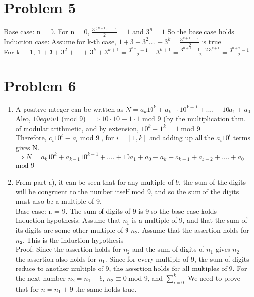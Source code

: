 \documentclass[english]{article}
\begin{document}
\section*{Problem 5}
Base case: n = 0. For n = 0, $ \frac{3^(n+1) - 1}{2} = 1$ and $3^n = 1$ So the base case holds\\
Induction case: Assume for k-th case, $1 + 3 + 3^2 ....+ 3^k = \frac{3^{k+1} - 1}{2} $ is true\\
For k + 1, $ 1 + 3 + 3^2 + ...+3^k + 3^{k+1} = \frac{3^{k+1} - 1}{2} + 3^{k+1} = \frac{3^{n+1} - 1 + 2.3^{k+1}}{2} = \frac{3^{n+2} - 1}{2}$
\section*{Problem 6}
\begin{enumerate} [label=\alph*]
\item A positive integer can be written as $N = a_k 10^k + a_{k-1} 10 ^ {k-1} + .... + 10 a_1 + a_0$ Also, $10 equiv 1 $ (mod 9) $\implies 10 \cdot 10 \equiv 1 \cdot 1 $ mod 9 (by the multiplication thm. of modular arithmetic, and by extension, $10^k \equiv 1^k = 1 $ mod 9\\
Therefore, $a_i 10^i \equiv a_i $ mod 9 , for $i = [1,k]$ and adding up all the $a_i 10^i$ terms gives N. $\Rightarrow N = a_k 10^k + a_{k-1} 10 ^ {k-1} + .... + 10 a_1 + a_0  \equiv a_k + a_{k-1} + a_{k-2} + .... + a_0 $ mod 9
\item From part a), it can be seen that for any multiple of 9, the sum of the digits will be congruent to the number itself mod 9, and so the sum of the digits must also be a multiple of 9.\\
Base case: n = 9. The sum of digits of 9 is 9 so the base case holds\\
Induction hypothesis: Assume that $n_1$ is a multiple of 9, and that the sum of its digits are some other multiple of 9 $n_2$. Assume that the assertion holds for $n_2$. This is the induction hypothesis \\
Proof: Since the assertion holds for $n_2$ and the sum of digits of $n_1$ gives $n_2$ the assertion also holds for $n_1$. Since for every multiple of 9, the sum of digits reduce to another multiple of 9, the assertion holds for all multiples of 9. 
For the next number $n_2 = n_1 + 9$, $n_2 \equiv 0$ mod 9, and $\sum_{i=0} ^{k}$
We need to prove that for $n = n_1 + 9$ the same holds true. 

\end{enumerate}
\end{document}
